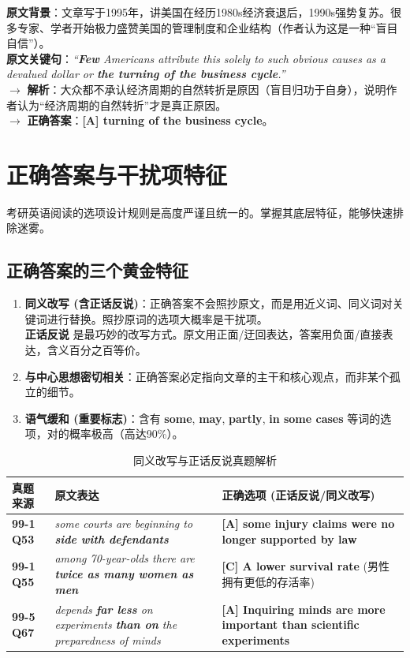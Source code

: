 \documentclass[cn,normal,11pt]{elegantnote}
\newcommand{\retrokey}[1]{{\color{accentcolor}\textbf{#1}}}
\newcommand{\tips}[1]{{\color{ecolor}\textbf{#1}}}
\begin{document}
\begin{example}
  \textbf{原文背景}：文章写于1995年，讲美国在经历1980s经济衰退后，1990s强势复苏。很多专家、学者开始极力盛赞美国的管理制度和企业结构（作者认为这是一种“盲目自信”）。\\
  \textbf{原文关键句}：\textit{“\retrokey{Few} Americans attribute this solely to such obvious causes as a devalued dollar or \retrokey{the turning of the business cycle}.”}\\
  $\rightarrow$ \textbf{解析}：大众都不承认经济周期的自然转折是原因（盲目归功于自身），说明作者认为“经济周期的自然转折”才是真正原因。\\
  $\rightarrow$ \textbf{正确答案}：\textbf{[A] turning of the business cycle}。
\end{example}

\section{正确答案与干扰项特征}
考研英语阅读的选项设计规则是高度严谨且统一的。掌握其底层特征，能够快速排除迷雾。

\subsection{正确答案的三个黄金特征}
\begin{enumerate}
  \item \retrokey{同义改写 (含正话反说)}：正确答案不会照抄原文，而是用近义词、同义词对关键词进行替换。照抄原词的选项大概率是干扰项。\\
  \tips{正话反说} 是最巧妙的改写方式。原文用正面/迂回表达，答案用负面/直接表达，含义百分之百等价。
  \item \retrokey{与中心思想密切相关}：正确答案必定指向文章的主干和核心观点，而非某个孤立的细节。
  \item \retrokey{语气缓和 (重要标志)}：含有 \textbf{some}, \textbf{may}, \textbf{partly}, \textbf{in some cases} 等词的选项，对的概率极高（高达90\%）。
\end{enumerate}

\begin{table}[H]
  \caption{同义改写与正话反说真题解析}
  \centering
  \small
  \begin{tabularx}{\textwidth}{l p{5cm} X}
    \toprule
    \textbf{真题来源} & \textbf{原文表达} & \textbf{正确选项 (正话反说/同义改写)} \\
    \midrule
    \textbf{99-1 Q53} & \textit{some courts are beginning to \retrokey{side with defendants}} & \textbf{[A] some injury claims were no longer supported by law} \\
    \midrule
    \textbf{99-1 Q55} & \textit{among 70-year-olds there are \retrokey{twice as many women as men}} & \textbf{[C] A lower survival rate} (男性拥有更低的存活率) \\
    \midrule
    \textbf{99-5 Q67} & \textit{depends \retrokey{far less} on experiments \retrokey{than on} the preparedness of minds} & \textbf{[A] Inquiring minds are more important than scientific experiments} \\
    \bottomrule
  \end{tabularx}
\end{table}
\end{document}
